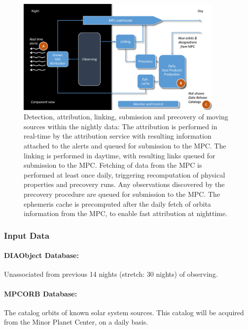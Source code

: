 \begin{figure}[th]
\begin{center}
\includegraphics[width=0.9\textwidth]{figures/solarsystempipeline.pdf}
\caption{\label{fig:apMOPS} Detection, attribution, linking, submission and precovery of moving sources within the nightly data: The attribution is performed in real-time by the attribution service with resulting information attached to the alerts and queued for submission to the MPC. The linking is performed in daytime, with resulting links queued for submission to the MPC. Fetching of data from the MPC is performed at least once daily, triggering recomputation of physical properties and precovery runs. Any observations discovered by the precovery procedure are queued for submission to the MPC. The ephemeris cache is precomputed after the daily fetch of orbita information from the MPC, to enable fast attribution at nighttime.}
\end{center}
\end{figure}

\subsubsection{Input Data}

\paragraph*{DIAObject Database: } Unassociated \DIASources from previous 14 nights (stretch: 30 nights) of observing.

\paragraph*{MPCORB Database: } The catalog orbits of known solar system sources. This catalog will be acquired from the Minor Planet Center, on a daily basis.

